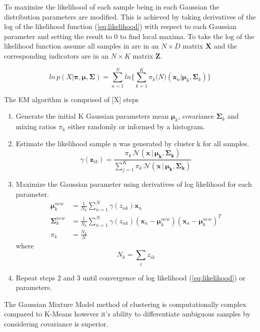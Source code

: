 To maximize the likelihood of each sample being in each Gaussian the distribution parameters are modified. This is achieved by taking derivatives of the log of the likelihood function (\ref{eq:likelihood}) with respect to each Gaussian parameter and setting the result to 0 to find local maxima. To take the log of the likelihood function assume all samples in are in an $N \times D$ matrix $\bm{X}$ and the corresponding indicators are in an $ N \times K$ matrix $\bm{Z}$. 

\begin{equation}
\label{eq:log}
ln\,p(X|\bm{\pi}, \bm{\mu}, \bm{\Sigma}) = \sum_{n=1}^N
ln \Bigg\{ \sum_{k=1}^K \pi_k\mathcal(N)(\bm{x}_n|\bm{\mu}_k,\bm{\Sigma}_k)\Bigg\}
\end{equation}







\centerline{}

The EM algorithm is comprised of [X] steps

\begin{enumerate}
	\item Generate the initial K Gaussian parameters mean $\bm{\mu}_{k}$, covariance $\bm{\Sigma}_k$ and mixing ratios $\pi_k$ either randomly or informed by a histogram.
	\item Estimate the likelihood sample n was generated by cluster k for all samples. 
	\begin{equation}
		\gamma(\bm{z}_{ik})=\frac{\pi_k\, \mathcal{N}(\bm{x}\,|\,\bm{\mu_k},\bm{\Sigma_k})}{\sum_{j=1}^{K}\pi_k\, \mathcal{N}(\bm{x}\,|\,\bm{\mu_k},\bm{\Sigma_k})}
	\end{equation}

	\item Maximize the Gaussian parameter using derivatives of log likelihood for each parameter.
	\begin{align}	
	\label{eq:mean}
	\bm{\mu}_{k}^{new} &= \frac{1}{N_k}\sum_{n=1}^N \gamma(z_{nk} ) \bm{x}_n \\
	\label{eq:covariance}
	\bm{\Sigma}_k^{new} &=  \frac{1}{N_k}\sum_{n=1}^N\gamma(z_{nk})(\bm{x}_n- \bm{\mu}_k^{new})(\bm{x}_n - \bm{\mu}_k^{new})^T \\
	\label{eq:ratio}
	\pi_k &= \frac{N_k}{N}
	\end{align}
	where \newline
	\[N_k = \sum_{i} z_{ik}\]
	\item Repeat steps 2 and 3 until convergence of log likelihood (\ref{eq:likelihood}) or parameters. 
\end{enumerate}

The Gaussian Mixture Model method of clustering is computationally complex compared to K-Means however it's ability to differentiate ambiguous samples by considering covariance is superior. 


